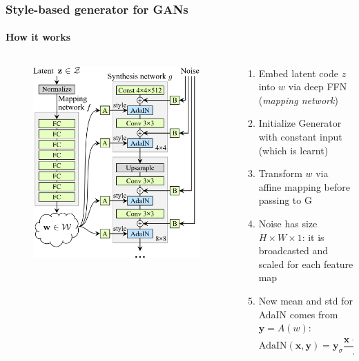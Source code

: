 \documentclass[10pt]{beamer}
\begin{document}
\begin{frame}
\frametitle{Style-based generator for GANs}
\framesubtitle{How it works}


\begin{columns}[T]

\begin{column}{6cm}
\begin{figure}
\centering
\includegraphics[width=\textwidth]{images/style-gan-architecture}
\end{figure}
\end{column}

\begin{column}{6cm}
\begin{enumerate}
    \item Embed latent code $z$ into $w$ via deep FFN (\textit{mapping network})
    \item Initialize Generator with constant input (which is learnt)
    \item Transform $w$ via affine mapping before passing to G
    \item Noise has size $H \times W \times 1$: it is broadcasted and scaled for each feature map
    \item New mean and std for AdaIN comes from $\bm y = A(w)$:
\[
\text{AdaIN}(\bm x, \bm y) = \bm y_\sigma \frac{\bm x - \mu(\bm x)}{\sigma (\bm x)} + \bm y_\mu
\]
\end{enumerate}
\end{column}
\end{columns}

\end{frame}
\end{document}
